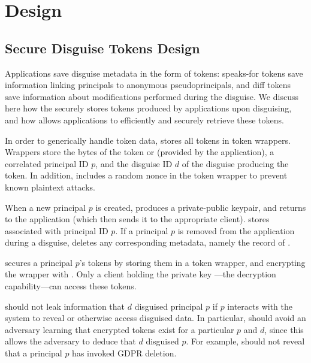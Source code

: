 \section{Design} 

\subsection{Secure Disguise Tokens Design} 
Applications save disguise metadata in the form of tokens: speaks-for tokens  save information linking
principals to anonymous pseudoprincipals, and diff tokens  save information about modifications
performed during the disguise. 
We discuss here how the \sys securely stores tokens produced by applications upon disguising, and
how \sys allows applications to efficiently and securely retrieve these tokens.

In order to generically handle token data, \sys stores all tokens in token wrappers. 
Wrappers store the bytes of the token  or  (provided
by the application), a correlated principal ID $p$, and the disguise ID $d$ of the disguise producing the
token. In addition, \sys includes a random nonce in the token wrapper to prevent known plaintext
attacks.

When a new principal $p$ is created, \sys produces a private-public keypair, and returns  to
the application (which then sends it to the appropriate client). \sys stores  associated
with principal ID $p$.
If a principal $p$ is removed from the application during a disguise, \sys deletes any corresponding metadata, namely
the record of .

\sys secures a principal $p$'s tokens by storing them in a token wrapper, and encrypting the wrapper
with . Only a client holding the private key ---the decryption
capability---can access these tokens.

\sys should not leak information that $d$ disguised principal $p$ if $p$ interacts with the system
to reveal or otherwise access disguised data. In particular, \sys should avoid an adversary learning
that encrypted tokens exist for a particular $p$ and $d$, since this allows the adversary to deduce
that $d$ disguised $p$. For example, \sys should not reveal that a principal $p$ has invoked GDPR
deletion.

